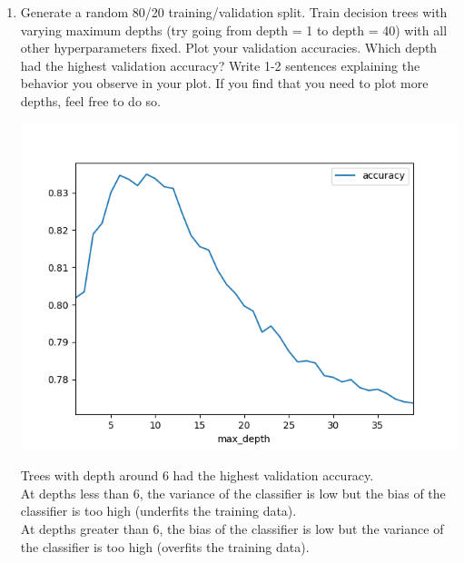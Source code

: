 \documentclass{article}
\begin{document}
\begin{enumerate}
\begin{enumerate}
      \item Generate a random 80/20 training/validation split. Train decision
        trees with varying maximum depths (try going from depth = 1 to depth =
        40) with all other hyperparameters fixed. Plot your validation
        accuracies. Which depth had the highest validation accuracy? Write 1-2
        sentences explaining the behavior you observe in your plot. If you find
        that you need to plot more depths, feel free to do so.
        \begin{mdframed}
          \includegraphics[width=400pt]{img/census_depth_experiment.png}

          Trees with depth around 6 had the highest validation accuracy.\\

          At depths less than 6, the variance of the classifier is low but the
          bias of the classifier is too high (underfits the training data).\\

          At depths greater than 6, the bias of the classifier is low but the
          variance of the classifier is too high (overfits the training data).
        \end{mdframed}

    \end{enumerate}


\end{enumerate}
\end{document}
